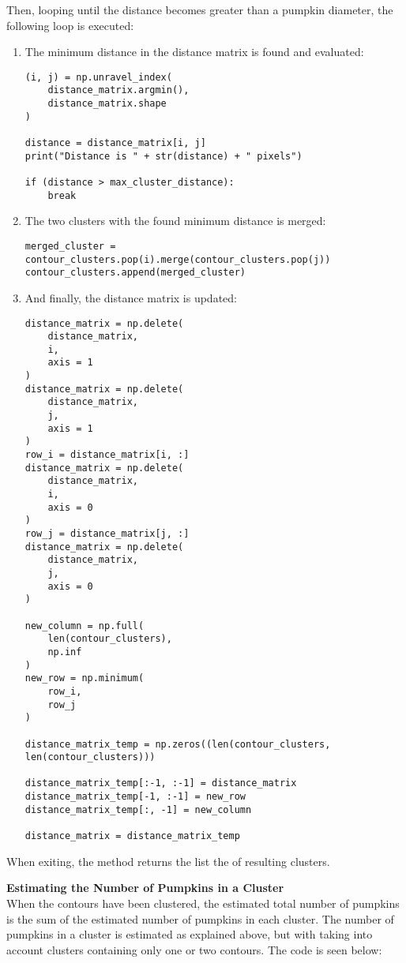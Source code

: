 \documentclass[../Head/Main.tex]{subfiles}
\begin{document}
Then, looping until the distance becomes greater than a pumpkin diameter, the following loop is executed:
\begin{enumerate}
\item The minimum distance in the distance matrix is found and evaluated:
\begin{verbatim}
(i, j) = np.unravel_index(
    distance_matrix.argmin(),
    distance_matrix.shape
)

distance = distance_matrix[i, j]
print("Distance is " + str(distance) + " pixels")

if (distance > max_cluster_distance):
    break
\end{verbatim}
\item The two clusters with the found minimum distance is merged:
\begin{verbatim}
merged_cluster = contour_clusters.pop(i).merge(contour_clusters.pop(j))
contour_clusters.append(merged_cluster)
\end{verbatim}
\item And finally, the distance matrix is updated:
\begin{verbatim}
distance_matrix = np.delete(
    distance_matrix,
    i,
    axis = 1
)
distance_matrix = np.delete(
    distance_matrix,
    j,
    axis = 1
)
row_i = distance_matrix[i, :]
distance_matrix = np.delete(
    distance_matrix,
    i,
    axis = 0
)
row_j = distance_matrix[j, :]
distance_matrix = np.delete(
    distance_matrix,
    j,
    axis = 0
)

new_column = np.full(
    len(contour_clusters),
    np.inf
)
new_row = np.minimum(
    row_i,
    row_j
)

distance_matrix_temp = np.zeros((len(contour_clusters, len(contour_clusters)))

distance_matrix_temp[:-1, :-1] = distance_matrix
distance_matrix_temp[-1, :-1] = new_row
distance_matrix_temp[:, -1] = new_column

distance_matrix = distance_matrix_temp
\end{verbatim}
\end{enumerate}
When exiting, the method returns the list the of resulting clusters.\par
\textbf{Estimating the Number of Pumpkins in a Cluster}\\
When the contours have been clustered, the estimated total number of pumpkins is the sum of the estimated number of pumpkins in each cluster. The number of pumpkins in a cluster is estimated as explained above, but with taking into account clusters containing only one or two contours. The code is seen below:
\end{document}
